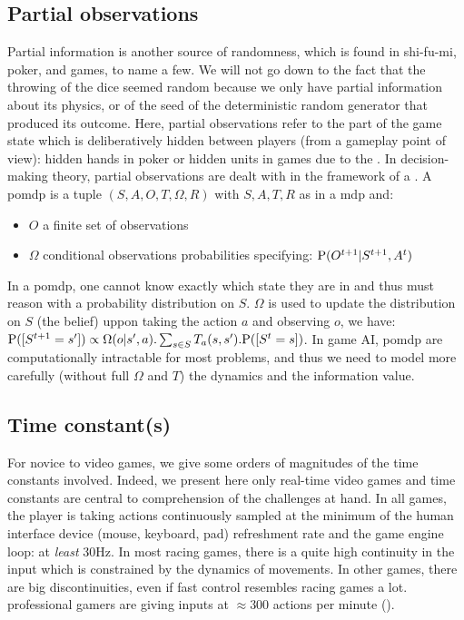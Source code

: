 \subsection{Partial observations}
Partial information is another source of randomness, which is found in shi-fu-mi, poker,  and  games, to name a few. We will not go down to the fact that the throwing of the dice seemed random because we only have partial information about its physics, or of the seed of the deterministic random generator that produced its outcome. Here, partial observations refer to the part of the game state which is deliberatively hidden between players (from a gameplay point of view): hidden hands in poker or hidden units in  games due to the . In decision-making theory, partial observations are dealt with in the framework of a  \citep{Sondik}. A \gls{pomdp} is a tuple $(S,A,O,T,\Omega,R)$ with $S,A,T,R$ as in a \gls{mdp} and:
\begin{itemize}
    \item $O$ a finite set of observations
    \item $\Omega$ conditional observations probabilities specifying: $\mathrm{P}(O^{t+1}|S^{t+1},A^t)$
\end{itemize}
In a \gls{pomdp}, one cannot know exactly which state they are in and thus must reason with a probability distribution on $S$. $\Omega$ is used to update the distribution on $S$ (the belief) uppon taking the action $a$ and observing $o$, we have: $\mathrm{P}([S^{t+1}=s']) \propto \Omega(o|s',a).\sum_{s \in S} T_a(s,s').\mathrm{P}([S^t=s])$. In game AI, \gls{pomdp} are computationally intractable for most problems, and thus we need to model more carefully (without full $\Omega$ and $T$) the dynamics and the information value.

\subsection{Time constant(s)}

For novice to video games, we give some orders of magnitudes of the time constants involved. Indeed, we present here only real-time video games and time constants are central to comprehension of the challenges at hand. In all games, the player is taking actions continuously sampled at the minimum of the human interface device (mouse, keyboard, pad) refreshment rate and the game engine loop: at \textit{least} 30Hz. In most racing games, there is a quite high continuity in the input which is constrained by the dynamics of movements. In other games, there are big discontinuities, even if fast  control resembles racing games a lot.  professional gamers are giving inputs at $\approx 300$ actions per minute ().


